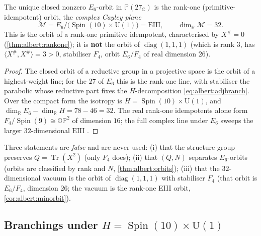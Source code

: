 \begin{corollary}\label{cor:albert:minorbit}
The unique closed nonzero $E_{6}$-orbit in $\mathbb{P}(27_{\mathbb{C}})$
is the rank-one (primitive-idempotent) orbit, the \emph{complex Cayley
plane}
\begin{equation}\label{eq:albert:EIII}
  \mathcal{M}
  = E_{6}/\bigl(\operatorname{Spin}(10)\times\mathrm{U}(1)\bigr)
  = \mathrm{EIII},
  \qquad
  \dim_{\mathbb{R}}\mathcal{M}=32 .
\end{equation}
This is the orbit of a rank-one primitive idempotent, characterised by
$X^{\#}=0$ (\autoref{thm:albert:rankone}); it is \textbf{not} the orbit
of $\operatorname{diag}(1,1,1)$ (which is rank $3$, has
$\langle X^{\#},X^{\#}\rangle=3>0$, stabiliser $F_{4}$, orbit $E_{6}/F_{4}$
of real dimension $26$).
\end{corollary}

\begin{proof}
The closed orbit of a reductive group in a projective space is the orbit
of a highest-weight line; for the $27$ of $E_{6}$ this is the rank-one
line, with stabiliser the parabolic whose reductive part fixes the
$H$-decomposition \eqref{eq:albert:adjbranch}. Over the compact form the
isotropy is $H=\operatorname{Spin}(10)\times\mathrm{U}(1)$, and
$\dim_{\mathbb{R}}E_{6}-\dim_{\mathbb{R}}H=78-46=32$. The real rank-one
idempotents alone form $F_{4}/\operatorname{Spin}(9)\cong
\mathbb{OP}^{2}$ of dimension $16$; the full complex line under $E_{6}$
sweeps the larger $32$-dimensional $\mathrm{EIII}$
\cite{Helgason:1978,Springer:2000}.
\end{proof}

\begin{remark}\label{rmk:albert:forbidden}
Three statements are \emph{false} and are never used:
(i) that the structure group preserves $Q=\operatorname{Tr}(X^{2})$
(only $F_{4}$ does);
(ii) that $(Q,N)$ separates $E_{6}$-orbits (orbits are classified by rank
and $N$, \autoref{thm:albert:orbits});
(iii) that the $32$-dimensional vacuum is the orbit of
$\operatorname{diag}(1,1,1)$ with stabiliser $F_{4}$ (that orbit is
$E_{6}/F_{4}$, dimension $26$; the vacuum is the rank-one EIII orbit,
\autoref{cor:albert:minorbit}).
\end{remark}

\subsection{Branchings under \texorpdfstring{$H=\operatorname{Spin}(10)\times\mathrm{U}(1)$}{H = Spin(10) x U(1)}}
\label{sec:albert:branchings}

